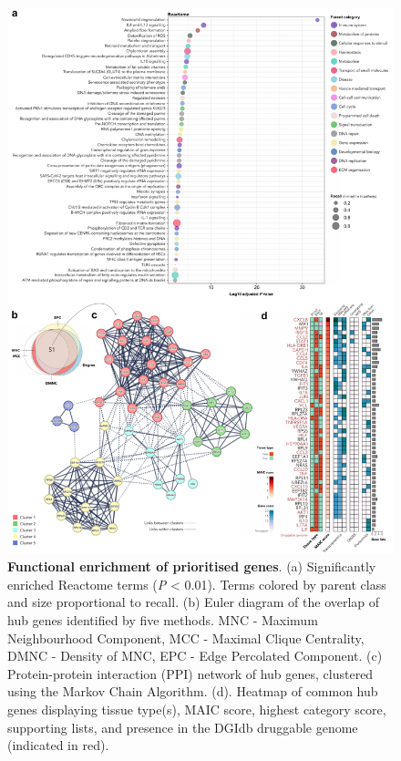 \documentclass[
  11,
  a4paper,
]{article}
\begin{document}
\begin{figure}

{\centering \includegraphics{./img/Figure_2.png}

}

\caption{\label{fig-fig2}\textbf{Functional enrichment of prioritised
genes}. (a) Significantly enriched Reactome terms (\emph{P} \textless{}
0.01). Terms colored by parent class and size proportional to recall.
(b) Euler diagram of the overlap of hub genes identified by five
methods. MNC - Maximum Neighbourhood Component, MCC - Maximal Clique
Centrality, DMNC - Density of MNC, EPC - Edge Percolated Component. (c)
Protein-protein interaction (PPI) network of hub genes, clustered using
the Markov Chain Algorithm. (d). Heatmap of common hub genes displaying
tissue type(s), MAIC score, highest category score, supporting lists,
and presence in the DGIdb druggable genome (indicated in red).}

\end{figure}
\end{document}
